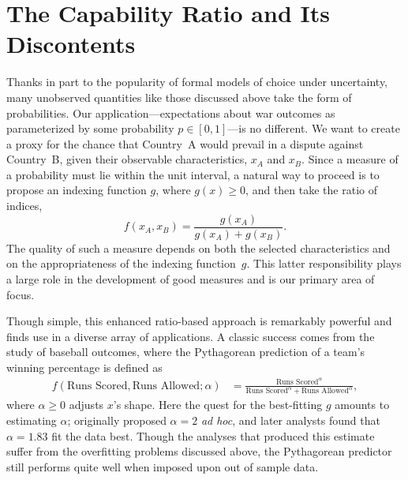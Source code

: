 \section{The Capability Ratio and Its Discontents}

Thanks in part to the popularity of formal models of choice under uncertainty, many unobserved quantities like those discussed above take the form of probabilities. 
Our application---expectations about war outcomes as parameterized by some probability $p \in [0,1]$---is no different.
We want to create a proxy for the chance that Country~A would prevail in a dispute against Country~B, given their observable characteristics, $x_A$ and $x_B$.
Since a measure of a probability must lie within the unit interval, a natural way to proceed is to propose an indexing function $g$, where $g(x) \geq 0$, and then take the ratio of indices,
\begin{equation}
  \label{eq:ratio}
  f(x_A, x_B)
  =
  \frac{g(x_A)}{g(x_A) + g(x_B)}.
\end{equation}
The quality of such a measure depends on both the selected characteristics and on the appropriateness of the indexing function~$g$.
This latter responsibility plays a large role in the development of good measures and is our primary area of focus.

Though simple, this enhanced ratio-based approach is remarkably powerful and finds use in a diverse array of applications. 
A classic success comes from the study of baseball outcomes, where the Pythagorean prediction \citep{james1983,miller2007} of a team's winning percentage is defined as
\begin{align*}
  f\left(\text{Runs Scored}, \text{Runs Allowed} ; \alpha\right) &= \frac{\text{Runs Scored}^\alpha}{\text{Runs Scored}^\alpha + \text{Runs Allowed}^\alpha},
\end{align*}
where $\alpha \geq 0$ adjusts $x$'s shape. 
Here the quest for the best-fitting $g$ amounts to estimating $\alpha$; \citet{james1983} originally proposed $\alpha = 2$ \emph{ad hoc}, and later analysts found that $\alpha = 1.83$ fit the data best. 
Though the analyses that produced this estimate suffer from the overfitting problems discussed above, the Pythagorean predictor still performs quite well when imposed upon out of sample data.


